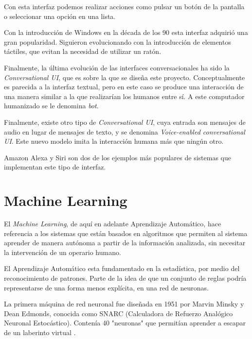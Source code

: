 Con esta interfaz podemos realizar acciones como pulsar un botón de la pantalla o seleccionar una opción en una lista. 

Con la introducción de Windows en la década de los 90 esta interfaz adquirió una gran popularidad. Siguieron evolucionando con la introducción de elementos táctiles, que evitan la necesidad de utilizar un ratón.


Finalmente, la última evolución de las interfaces conversacionales ha sido la \textit{Conversational UI}, que es sobre la que se diseña este proyecto. Conceptualmente es parecida a la interfaz textual, pero en este caso se produce una interacción de una manera similar a la que realizarían los humanos entre sí. A este computador humanizado se le denomina \textit{bot}. 


Finalmente, existe otro tipo de \textit{Conversational UI}, cuya entrada son mensajes de audio en lugar de mensajes de texto, y se denomina \textit{Voice-enabled conversational UI}. Este nuevo modelo imita la interacción humana más que ningún otro.


Amazon Alexa y Siri son dos de los ejemplos más populares de sistemas que implementan este tipo de interfaz.


\newpage

\section{Machine Learning}

El \textit{Machine Learning}, de aquí en adelante Aprendizaje Automático, hace referencia a los sistemas que están basados en algoritmos que permiten al sistema aprender de manera autónoma a partir de la información analizada, sin necesitar la intervención de un operario humano.

El Aprendizaje Automático esta fundamentado en la estadística, por medio del reconocimiento de patrones. Parte de la idea de que un conjunto de reglas podría representarse de una forma menos explícita, en una red de neuronas.


La primera máquina de red neuronal fue diseñada en 1951 por Marvin Minsky y Dean Edmonds, conocida como SNARC (Calculadora de Refuerzo Analógico Neuronal Estocástico). Contenía 40 "neuronas" que permitían aprender a escapar de un laberinto virtual \cite{machineLearning}.

